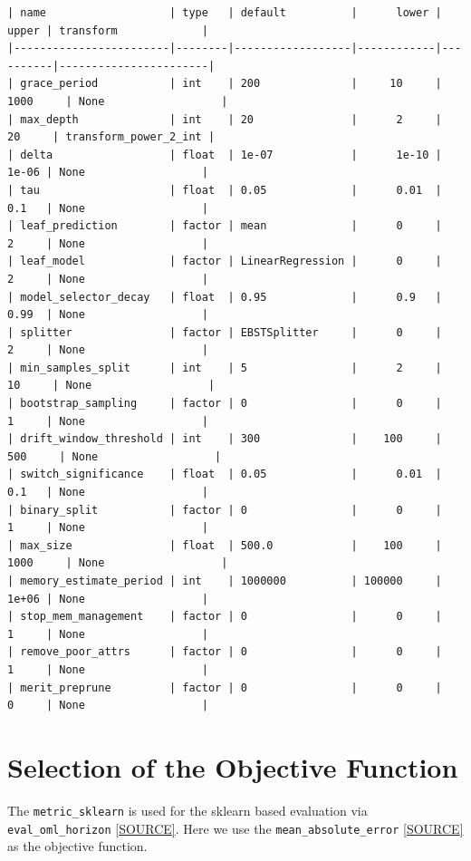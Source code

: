 \documentclass[
  letterpaper,
  DIV=11,
  numbers=noendperiod]{scrreprt}
\begin{document}
\begin{verbatim}
| name                   | type   | default          |      lower |    upper | transform             |
|------------------------|--------|------------------|------------|----------|-----------------------|
| grace_period           | int    | 200              |     10     | 1000     | None                  |
| max_depth              | int    | 20               |      2     |   20     | transform_power_2_int |
| delta                  | float  | 1e-07            |      1e-10 |    1e-06 | None                  |
| tau                    | float  | 0.05             |      0.01  |    0.1   | None                  |
| leaf_prediction        | factor | mean             |      0     |    2     | None                  |
| leaf_model             | factor | LinearRegression |      0     |    2     | None                  |
| model_selector_decay   | float  | 0.95             |      0.9   |    0.99  | None                  |
| splitter               | factor | EBSTSplitter     |      0     |    2     | None                  |
| min_samples_split      | int    | 5                |      2     |   10     | None                  |
| bootstrap_sampling     | factor | 0                |      0     |    1     | None                  |
| drift_window_threshold | int    | 300              |    100     |  500     | None                  |
| switch_significance    | float  | 0.05             |      0.01  |    0.1   | None                  |
| binary_split           | factor | 0                |      0     |    1     | None                  |
| max_size               | float  | 500.0            |    100     | 1000     | None                  |
| memory_estimate_period | int    | 1000000          | 100000     |    1e+06 | None                  |
| stop_mem_management    | factor | 0                |      0     |    1     | None                  |
| remove_poor_attrs      | factor | 0                |      0     |    1     | None                  |
| merit_preprune         | factor | 0                |      0     |    0     | None                  |
\end{verbatim}

\hypertarget{selection-of-the-objective-function}{%
\section{Selection of the Objective
Function}\label{selection-of-the-objective-function}}

The \texttt{metric\_sklearn} is used for the sklearn based evaluation
via \texttt{eval\_oml\_horizon}
\href{https://github.com/sequential-parameter-optimization/spotRiver/blob/main/src/spotRiver/evaluation/eval_bml.py}{{[}SOURCE{]}}.
Here we use the \texttt{mean\_absolute\_error}
\href{https://scikit-learn.org/stable/modules/generated/sklearn.metrics.mean_absolute_error.html}{{[}SOURCE{]}}
as the objective function.
\end{document}
